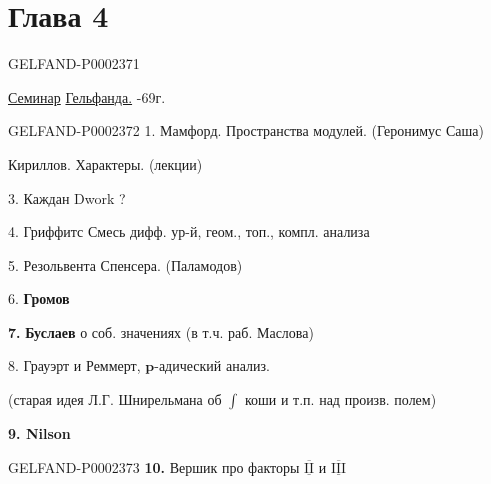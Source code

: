 \clearpage\section*{Глава 4}

\begin{GelfandAdjacentEvidence}{GELFAND-P000237}{1}
\end{GelfandAdjacentEvidence}

\underline{Семинар} \quad \underline{Гельфанда.} -69г.



\begin{GelfandAdjacentEvidence}{GELFAND-P000237}{2}
1. Мамфорд. Пространства модулей. (Геронимус Саша)



\end{GelfandAdjacentEvidence}

Кириллов. Характеры. (лекции)



3. Каждан \quad Dwork ?



4. Гриффитс \quad Смесь дифф. ур-й, геом., топ., компл. анализа



5. Резольвента Спенсера. (Паламодов)



6. \textbf{Громов}

\textbf{7.} \textbf{Буслаев} о соб. значениях (в т.ч. раб. Маслова)



8. Грауэрт и Реммерт, $\boldsymbol{p}$-адический анализ.

(старая идея Л.Г. Шнирельмана об $\int$ коши и т.п. над произв. полем)



\textbf{9. Nilson}



\begin{GelfandAdjacentEvidence}{GELFAND-P000237}{3}
\textbf{10.} Вершик про факторы $\underline{\overline{\mathrm{II}}}$ и $\underline{\overline{\mathrm{III}}}$



\end{GelfandAdjacentEvidence}

